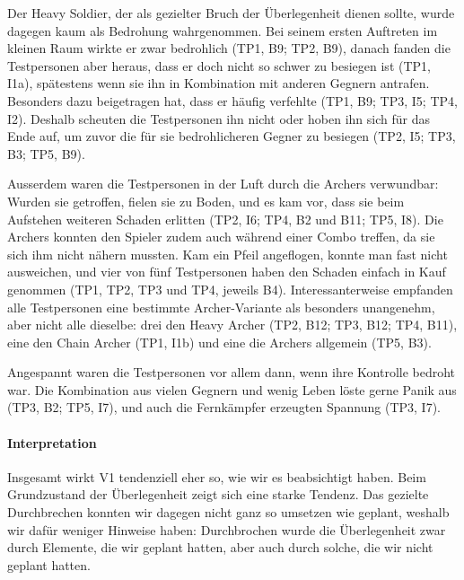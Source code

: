 \documentclass[../Main.tex]{subfiles}
\begin{document}
Der Heavy Soldier, der als gezielter Bruch der Überlegenheit dienen sollte, wurde dagegen kaum als Bedrohung wahrgenommen. Bei seinem ersten Auftreten im kleinen Raum wirkte er zwar bedrohlich (TP1, B9; TP2, B9), danach fanden die Testpersonen aber heraus, dass er doch nicht so schwer zu besiegen ist (TP1, I1a), spätestens wenn sie ihn in Kombination mit anderen Gegnern antrafen. Besonders dazu beigetragen hat, dass er häufig verfehlte (TP1, B9; TP3, I5; TP4, I2). Deshalb scheuten die Testpersonen ihn nicht oder hoben ihn sich für das Ende auf, um zuvor die für sie bedrohlicheren Gegner zu besiegen (TP2, I5; TP3, B3; TP5, B9).

Ausserdem waren die Testpersonen in der Luft durch die Archers verwundbar: Wurden sie getroffen, fielen sie zu Boden, und es kam vor, dass sie beim Aufstehen weiteren Schaden erlitten (TP2, I6; TP4, B2 und B11; TP5, I8). Die Archers konnten den Spieler zudem auch während einer Combo treffen, da sie sich ihm nicht nähern mussten. Kam ein Pfeil angeflogen, konnte man fast nicht ausweichen, und vier von fünf Testpersonen haben den Schaden einfach in Kauf genommen (TP1, TP2, TP3 und TP4, jeweils B4). Interessanterweise empfanden alle Testpersonen eine bestimmte Archer-Variante als besonders unangenehm, aber nicht alle dieselbe: drei den Heavy Archer (TP2, B12; TP3, B12; TP4, B11), eine den Chain Archer (TP1, I1b) und eine die Archers allgemein (TP5, B3).

Angespannt waren die Testpersonen vor allem dann, wenn ihre Kontrolle bedroht war. Die Kombination aus vielen Gegnern und wenig Leben löste gerne Panik aus (TP3, B2; TP5, I7), und auch die Fernkämpfer erzeugten Spannung (TP3, I7).

\paragraph{Interpretation}
Insgesamt wirkt V1 tendenziell eher so, wie wir es beabsichtigt haben. Beim Grundzustand der Überlegenheit zeigt sich eine starke Tendenz. Das gezielte Durchbrechen konnten wir dagegen nicht ganz so umsetzen wie geplant, weshalb wir dafür weniger Hinweise haben: Durchbrochen wurde die Überlegenheit zwar durch Elemente, die wir geplant hatten, aber auch durch solche, die wir nicht geplant hatten.
\end{document}

